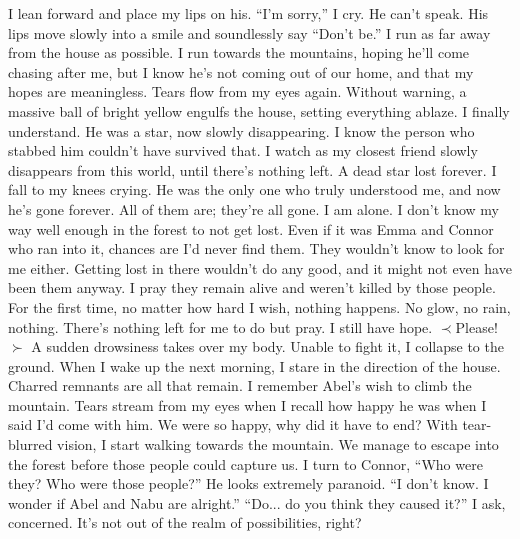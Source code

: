 \documentclass[openany, 12pt]{book}
\newcommand\tab[1][1cm]{\hspace*{#1}}
\begin{document}
\newline
\tab
I lean forward and place my lips on his. ``I’m sorry,'' I cry. He can’t speak. His lips move slowly into a smile and soundlessly say ``Don’t be.'' I run as far away from the house as possible. I run towards the mountains, hoping he’ll come chasing after me, but I know he’s not coming out of our home, and that my hopes are meaningless. Tears flow from my eyes again. Without warning, a massive ball of bright yellow engulfs the house, setting everything ablaze.
\newline
\tab
I finally understand. He was a star, now slowly disappearing. I know the person who stabbed him couldn’t have survived that. I watch as my closest friend slowly disappears from this world, until there’s nothing left. A dead star lost forever. I fall to my knees crying. He was the only one who truly understood me, and now he’s gone forever. All of them are; they’re all gone. I am alone. I don’t know my way well enough in the forest to not get lost. Even if it was Emma and Connor who ran into it, chances are I’d never find them. They wouldn’t know to look for me either. Getting lost in there wouldn’t do any good, and it might not even have been them anyway. I pray they remain alive and weren’t killed by those people. For the first time, no matter how hard I wish, nothing happens. No glow, no rain, nothing. There’s nothing left for me to do but pray. I still have hope.
\newline
$\prec$Please!$\succ$
\newline
\tab
A sudden drowsiness takes over my body. Unable to fight it, I collapse to the ground.
\newline
\tab
When I wake up the next morning, I stare in the direction of the house. Charred remnants are all that remain. I remember Abel’s wish to climb the mountain. Tears stream from my eyes when I recall how happy he was when I said I’d come with him. We were so happy, why did it have to end? With tear-blurred vision, I start walking towards the mountain.
\newline
\newline
\tab
We manage to escape into the forest before those people could capture us. I turn to Connor, ``Who were they? Who were those people?''
\newline
\tab
He looks extremely paranoid. ``I don’t know. I wonder if Abel and Nabu are alright.''
\newline
\tab
``Do... do you think they caused it?'' I ask, concerned. It’s not out of the realm of possibilities, right?
\end{document}
